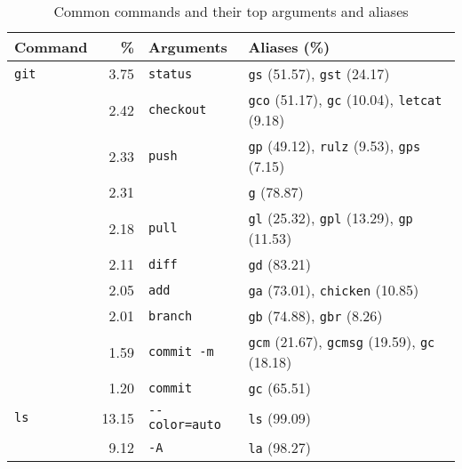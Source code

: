 \begin{table*}
    \caption{Common commands and their top arguments and aliases}
    \label{tab:command-summary}
    \begin{tabular}{lrll}
        \toprule
             Command &           \% &                 Arguments &                                                                                 Aliases (\%) \\
        \midrule
          \verb|git| &   \num{3.75} &             \verb|status| &                                  \verb|gs| (\num{51.57}), \verb|gst| (\num{24.17}) \\
                     &   \num{2.42} &           \verb|checkout| & \verb|gco| (\num{51.17}), \verb|gc| (\num{10.04}), \verb|letcat| (\num{9.18}) \\
                     &   \num{2.33} &               \verb|push| &    \verb|gp| (\num{49.12}), \verb|rulz| (\num{9.53}), \verb|gps| (\num{7.15}) \\
                     &   \num{2.31} &                   \verb|| &                                                                  \verb|g| (\num{78.87}) \\
                     &   \num{2.18} &               \verb|pull| &    \verb|gl| (\num{25.32}), \verb|gpl| (\num{13.29}), \verb|gp| (\num{11.53}) \\
                     &   \num{2.11} &               \verb|diff| &                                                                 \verb|gd| (\num{83.21}) \\
                     &   \num{2.05} &                \verb|add| &                              \verb|ga| (\num{73.01}), \verb|chicken| (\num{10.85}) \\
                     &   \num{2.01} &             \verb|branch| &                                   \verb|gb| (\num{74.88}), \verb|gbr| (\num{8.26}) \\
                     &   \num{1.59} &          \verb|commit -m| & \verb|gcm| (\num{21.67}), \verb|gcmsg| (\num{19.59}), \verb|gc| (\num{18.18}) \\
                     &   \num{1.20} &             \verb|commit| &                                                                 \verb|gc| (\num{65.51}) \\
        \midrule
           \verb|ls| &  \num{13.15} &       \verb|--color=auto| &                                                                 \verb|ls| (\num{99.09}) \\
                     &   \num{9.12} &                 \verb|-A| &                                                                 \verb|la| (\num{98.27}) \\

\end{tabular}
\end{table*}
